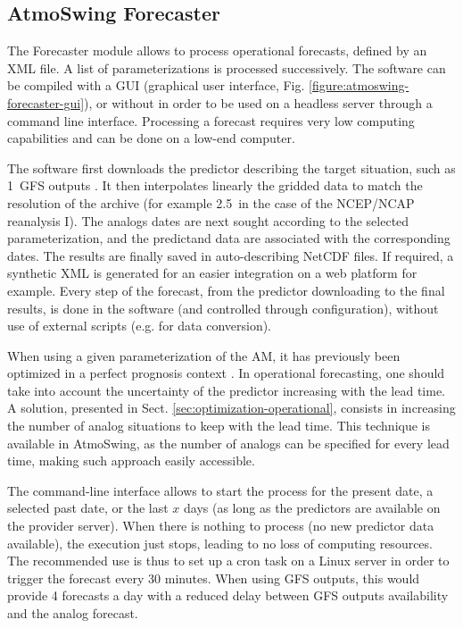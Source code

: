 \documentclass[review]{elsarticle}
\begin{document}
\subsection{AtmoSwing Forecaster}
\label{sec:forecaster}

The Forecaster module allows to process operational forecasts, defined by an XML file. A list of parameterizations is processed successively. The software can be compiled with a GUI (graphical user interface, Fig. \ref{figure:atmoswing-forecaster-gui}), or without in order to be used on a headless server through a command line interface. Processing a forecast requires very low computing capabilities and can be done on a low-end computer. 

The software first downloads the predictor describing the target situation, such as 1\degree\ GFS outputs \citep[Global Forecast System,][see Sect. \ref{sec:data}]{Kanamitsu1991,Kanamitsu1989}. It then interpolates linearly the gridded data to match the resolution of the archive (for example 2.5\degree\ in the case of the NCEP/NCAP reanalysis I). The analogs dates are next sought according to the selected parameterization, and the predictand data are associated with the corresponding dates. The results are finally saved in auto-describing NetCDF files. If required, a synthetic XML is generated for an easier integration on a web platform for example. Every step of the forecast, from the predictor downloading to the final results, is done in the software (and controlled through configuration), without use of external scripts (e.g. for data conversion).

When using a given parameterization of the AM, it has previously been optimized in a perfect prognosis context \citep[i.e. by optimizing on the reanalysis dataset; however, this does not take into account the uncertainty of the target situation when taken from operational forecasts of a Numerical Weather Prediction model,][]{Klein1963}. In operational forecasting, one should take into account the uncertainty of the predictor increasing with the lead time. A solution, presented in Sect. \ref{sec:optimization-operational}, consists in increasing the number of analog situations to keep with the lead time. This technique is available in AtmoSwing, as the number of analogs can be specified for every lead time, making such approach easily accessible.

The command-line interface allows to start the process for the present date, a selected past date, or the last $x$ days (as long as the predictors are available on the provider server). When there is nothing to process (no new predictor data available), the execution just stops, leading to no loss of computing resources. The recommended use is thus to set up a cron task on a Linux server in order to trigger the forecast every 30 minutes. When using GFS outputs, this would provide 4 forecasts a day with a reduced delay between GFS outputs availability and the analog forecast.
\end{document}
